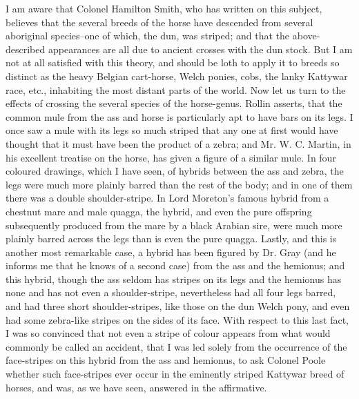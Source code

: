 I am aware that Colonel Hamilton Smith, who has written on this subject, believes that the several breeds of the horse have descended from several aboriginal species--one of which, the dun, was striped; and that the above-described appearances are all due to ancient crosses with the dun stock. But I am not at all satisfied with this theory, and should be loth to apply it to breeds so distinct as the heavy Belgian cart-horse, Welch ponies, cobs, the lanky Kattywar race, etc., inhabiting the most distant parts of the world.
Now let us turn to the effects of crossing the several species of the horse-genus. Rollin asserts, that the common mule from the ass and horse is particularly apt to have bars on its legs. I once saw a mule with its legs so much striped that any one at first would have thought that it must have been the product of a zebra; and Mr. W. C. Martin, in his excellent treatise on the horse, has given a figure of a similar mule. In four coloured drawings, which I have seen, of hybrids between the ass and zebra, the legs were much more plainly barred than the rest of the body; and in one of them there was a double shoulder-stripe. In Lord Moreton's famous hybrid from a chestnut mare and male quagga, the hybrid, and even the pure offspring subsequently produced from the mare by a black Arabian sire, were much more plainly barred across the legs than is even the pure quagga. Lastly, and this is another most remarkable case, a hybrid has been figured by Dr. Gray (and he informs me that he knows of a second case) from the ass and the hemionus; and this hybrid, though the ass seldom has stripes on its legs and the hemionus has none and has not even a shoulder-stripe, nevertheless had all four legs barred, and had three short shoulder-stripes, like those on the dun Welch pony, and even had some zebra-like stripes on the sides of its face. With respect to this last fact, I was so convinced that not even a stripe of colour appears from what would commonly be called an accident, that I was led solely from the occurrence of the face-stripes on this hybrid from the ass and hemionus, to ask Colonel Poole whether such face-stripes ever occur in the eminently striped Kattywar breed of horses, and was, as we have seen, answered in the affirmative.
